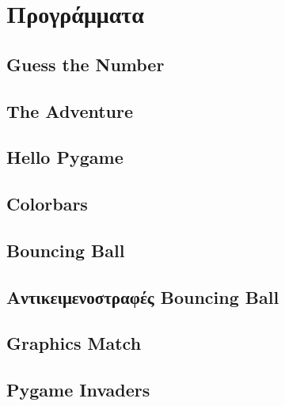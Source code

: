\chapter{Προγράμματα}
\section{Guess the Number}
\label{listing:guess}
\section{The Adventure}
\label{listing:adventure}
\section{Hello Pygame}
\label{listing:hello-pygame}
\section{Colorbars}
\label{listing:colorbars}
\section{Bouncing Ball}
\label{listing:bouncing-ball}
\section{Αντικειμενοστραφές Bouncing Ball}
\label{listing:bouncing-ball-oop}
\section{Graphics Match}
\label{listing:graphics-match}
\section{Pygame Invaders}
\label{listing:pygame-invaders}
